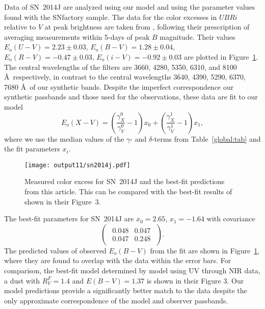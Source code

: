 \documentclass{aastex61}   	%
\begin{document}
Data of SN~2014J are  analyzed using our model and using the parameter values found with the SNfactory sample.
The data for the color excesses  in $UBRi$  relative to $V$ at peak brightness  are taken from \citet{2014ApJ...788L..21A},
following their prescription of averaging measurements within 5-days of peak $B$ magnitude.
Their values 
$E_o(U-V) =   2.23 \pm   0.03$,
$E_o(B-V) =   1.28 \pm   0.04$,
$E_o(R-V) =  -0.47 \pm   0.03$,
$E_o(i-V) =  -0.92 \pm   0.03$
are plotted in Figure~\ref{sn2014j:fig}.
\color{red}
The central wavelengths of the filters are 3660, 4280, 5350, 6310, and 8100 \AA\ respectively, in contrast to the central
wavelengths 
3640, 4390, 5290, 6370, 7680 \AA\ of our synthetic bands.  Despite the imperfect correspondence our synthetic passbands
and those used for the observations,
\color{black}
these data are fit to our model
\begin{equation}
E_o(X-V) =  \left(\frac{\gamma^0_X}{\gamma^0_V}-1\right)x_0 +  \left(\frac{\gamma^1_X}{\gamma^1_V}-1\right)x_1,
\end{equation}
where we use the median values of the $\gamma$- and $\delta$-terms from Table~\ref{global:tab} and the fit
parameters $x_i $.

\begin{figure}[htbp] %
   \centering
   \texttt{[image: output11/sn2014j.pdf]} 
   \caption{Measured color excess for SN~2014J and the best-fit predictions from this article. 
   \color{red}
   This can be compared with the best-fit results of
   \citet{2014ApJ...788L..21A} shown in their Figure~3.
   \color{black}
   \label{sn2014j:fig}}
\end{figure}

The best-fit parameters for SN~2014J are 
$x_0= 2.65$, $ x_1=-1.64$ with covariance
\begin{equation}
\begin{pmatrix}
\begin{array}{rr}
0.048 & 0.047 \\
0.047 & 0.248
\end{array}
\end{pmatrix}.
\end{equation}
The predicted values of observed $E_o(B-V)$ from the fit are shown in Figure~\ref{sn2014j:fig}, where they are found to
overlap with the data within the error bars.   For comparison, the best-fit model determined by  \citet{2014ApJ...788L..21A} model using
UV through NIR data,
a  \citet{1999PASP..111...63F} dust with $R_V^F=1.4$ and $E(B-V)=1.37$
\color{red}
is shown in their Figure 3.
\color{black}
Our model predictions provide a significantly better match to the data
\color{red}
despite the only approximate correspondence of the model and observer passbands.
\color{black}
\end{document}
